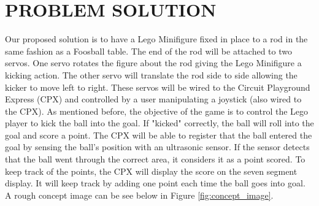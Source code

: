 \documentclass[12pt]{article}
\begin{document}
\section{PROBLEM SOLUTION}



Our proposed solution is to have a Lego Minifigure fixed in place to a rod in the same fashion as a Foosball table.
The end of the rod will be attached to two servos. One servo rotates the figure about the rod giving the Lego
Minifigure a kicking action. The other servo will translate the rod side to side allowing the kicker to move left to 
right. These servos will be wired to the Circuit Playground Express (CPX) and controlled by a user manipulating a 
joystick (also wired to the CPX). As mentioned before, the objective of the game is to control the Lego player to kick the ball into the 
goal. If "kicked" correctly, the ball will roll into the goal and score a point. The CPX will be able to register
that the ball entered the goal by sensing the ball's position with an ultrasonic sensor. If the sensor detects that
the ball went through the correct area, it considers it as a point scored. To keep track of the points, the CPX will 
display the score on the seven segment display. It will keep track by adding one point each time the ball goes into 
goal. A rough concept image can be see below in Figure \ref{fig:concept_image}.

\newpage
\end{document}
